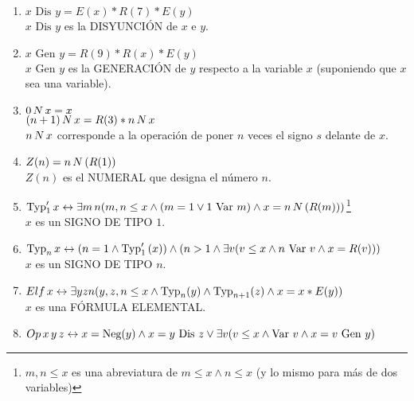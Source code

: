 \begin{enumerate}
    \item $x \text{ Dis } y = E(x) * R(7) * E(y)$ \\ $x \text{ Dis } y$ es la DISYUNCIÓN de $x$ e $y$.
    \item $x \text{ Gen } y = R(9) * R(x) * E(y)$ \\ $x \text{ Gen } y$ es la GENERACIÓN de $y$ respecto a la variable $x$ (suponiendo que $x$ sea una variable).
    \item $0 \thinspace N \thinspace x = x$ \\ $(n+1) \thinspace N \thinspace x = R(3) * n \thinspace N \thinspace x$ \\ 
            $n \thinspace N \thinspace x$ corresponde a la operación de poner $n$ veces el signo $s$ delante de $x$.
    \item $Z(n) = n \thinspace N \thinspace (R(1))$ \\ $Z(n)$ es el NUMERAL que designa el número $n$.
    \item $\text{Typ}_1' \thinspace x \leftrightarrow \exists m \thinspace n(m,n \leq x \wedge (m=1 \vee 1 \text{ Var } m) 
            \wedge x = n \thinspace N \thinspace (R(m)))$\footnote{$m,n \leq x$ es una abreviatura de $m \leq x \wedge n \leq x$ (y lo mismo para 
            más de dos variables)} \\ $x$ es un SIGNO DE TIPO $1$.
    \item $\text{Typ}_n \thinspace x \leftrightarrow (n=1 \wedge \text{Typ}_1' \thinspace (x)) \wedge (n>1 \wedge \exists v (v \leq x \wedge n \text{ Var } v \wedge x = R(v)))$ \\
            $x$ es un SIGNO DE TIPO $n$.
    \item $Elf \thinspace x \leftrightarrow \exists yzn (y, z, n \leq x \wedge \text{Typ}_n(y) \wedge \text{Typ}_{n+1}(z) \wedge x = x* E(y))$ \\ $x$ es una FÓRMULA ELEMENTAL.
    \item $Op \thinspace x \thinspace y \thinspace z \leftrightarrow x = \text{Neg}(y) \wedge x = y \text{ Dis } z \vee \exists v (v \leq x \wedge \text{Var } v \wedge 
            x = v \text{ Gen } y)$ 
\end{enumerate}




\endinput


